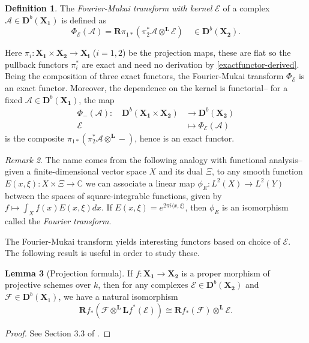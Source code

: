 \documentclass[a4paper]{article}
\theoremstyle{definition}
\newtheorem{defn}{Definition}[section]
\newtheorem{lemma}[defn]{Lemma}
\theoremstyle{remark}
\newtheorem{remark}[defn]{Remark}
\newcommand{\deri}{\mathbf{D}}
\newcommand{\deritensor}{\ensuremath{\otimes^\mathbf{L}}}
\begin{document}
\begin{defn} The \textit{Fourier-Mukai transform with kernel \(\mathscr{E}\)} of
    a complex \(\mathscr{A}\in \deri^b(\mathbf{X_1})\) is defined as 
    \[\Phi_\mathscr{E}(\mathscr{A})= \mathbf{R}\pi_{1\ast}(\pi_2^\ast
    \mathscr{A}\deritensor \mathscr{E}) \quad \in \deri^b(\mathbf{X_2}).\]
\end{defn}

Here \(\pi_i: \mathbf{X_1}\times \mathbf{X_2}\rightarrow \mathbf{X_i}\)
(\(i=1,2\)) be the projection maps, these are flat so the pullback functors
\(\pi_i^\ast\) are exact and need no derivation by \cref{exactfunctor-derived}.
Being the composition of three exact functors, the Fourier-Mukai transform
\(\Phi_\mathscr{E}\) is an exact functor. Moreover, the dependence on the kernel
is functorial-- for a fixed \(\mathscr{A}\in \deri^b(\mathbf{X_1})\), the map
\begin{align*} 
    \Phi_-(\mathscr{A}):\quad \deri^b(\mathbf{X_1}\times \mathbf{X_2})
    &\longrightarrow \deri^b(\mathbf{X_2})\\
    \mathscr{E}&\longmapsto \Phi_\mathscr{E}(\mathscr{A})
\end{align*}
is the composite \(\pi_{1\ast}(\pi_2^\ast\mathscr{A}\deritensor -)\), hence is
an exact functor. 

\begin{remark}
The name comes from the following analogy with functional analysis-- given a
finite-dimensional vector space \(X\) and its dual \(\Xi\), to any smooth
function \(E(x,\xi): X\times \Xi \rightarrow \mathbb{C}\) we can associate a
linear map \({\phi_E: L^2(X)\rightarrow L^2(Y)}\) between the spaces of
square-integrable functions, given by \({f\mapsto \int_X f(x)E(x,\xi)dx}\). If
\({E(x,\xi)= e^{2\pi i \langle x,\xi\rangle}}\), then \(\phi_E\) is an
isomorphism called the \textit{Fourier transform}. 
\end{remark}

The Fourier-Mukai transform yields interesting functors based on choice of
\(\mathscr{E}\). The following result is useful in order to study these.

\begin{lemma}[Projection formula] If \(f:\mathbf{X_1}\rightarrow \mathbf{X_2}\) is
    a proper morphism of projective schemes over \(k\), then for any complexes 
    \(\mathscr{E}\in\deri^b(\mathbf{X_2})\) and \(\mathscr{F}\in
    \deri^b(\mathbf{X}_1)\), we have a natural isomorphism
    \[\mathbf{R}f_\ast(\mathscr{F}\deritensor
    \mathbf{L}f^\ast(\mathscr{E}))\cong\mathbf{R}f_\ast(\mathscr{F})\deritensor
    \mathscr{E}.\] 
    \begin{proof}
        See Section 3.3 of .
    \end{proof}
\end{lemma}
\end{document}
